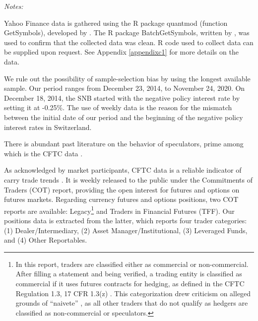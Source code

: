 \documentclass[a4paper, twoside]{templates/ociamthesis}
\begin{document}
\begin{table}[!ht]
{\begin{threeparttable}
\begin{tablenotes}[para]
\item \textit{\footnotesize{Notes:}} 
\item \footnotesize{Yahoo Finance data is gathered using the R package quantmod (function GetSymbols), developed by \textcite{ryan2020}. The R package BatchGetSymbols, written by \textcite{perlin2020}, was used to confirm that the collected data was clean. R code used to collect data can be supplied upon request. See Appendix \ref{appendixc1} for more details on the data.}
\end{tablenotes}
\end{threeparttable}}
\end{table}

We rule out the possibility of sample-selection bias by using the longest available sample. Our period ranges from December 23, 2014, to November 24, 2020. On December 18, 2014, the SNB started with the negative policy interest rate by setting it at -0.25\%. The use of weekly data is the reason for the mismatch between the initial date of our period and the beginning of the negative policy interest rates in Switzerland.

There is abundant past literature on the behavior of speculators, prime among which is the CFTC data \autocites[e.g.][]{houthakker1957,chalupa1982,goldstein1983,chang1997,adrangi1998,klitgaard2004,mogford2006,galati2007,nishigaki2007,brunnermeier2008,gubler2014,mulligan2018,tomio2020,kang2020,hasselgren2020}.

As acknowledged by market participants, CFTC data is a reliable indicator of carry trade trends \autocite{bankforinternationalsettlements2015}. It is weekly released to the public under the Commitments of Traders (COT) report, providing the open interest for futures and options on futures markets. Regarding currency futures and options positions, two COT reports are available: Legacy\footnote{In this report, traders are classified either as commercial or non-commercial. After filling a statement and being verified, a trading entity is classified as commercial if it uses futures contracts for hedging, as defined in the CFTC Regulation 1.3, 17 CFR 1.3(z) \autocite{commodityfuturestradingcommission2020}. This categorization drew criticism on alleged grounds of ``naivete'' \autocite[ 1296]{hartzmark1987}, as all other traders that do not qualify as hedgers are classified as non-commercial or speculators.} and Traders in Financial Futures (TFF). Our positions data is extracted from the latter, which reports four trader categories: (1) Dealer/Intermediary, (2) Asset Manager/Institutional, (3) Leveraged Funds, and (4) Other Reportables.
\end{document}

